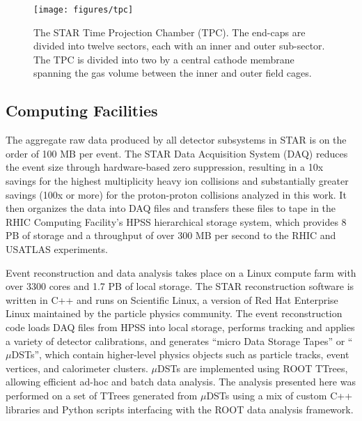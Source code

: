 \begin{figure}
  \texttt{[image: figures/tpc]}
  \caption{The STAR Time Projection Chamber (TPC). The end-caps are divided
  into twelve sectors, each with an inner and outer sub-sector. The TPC is
  divided into two by a central cathode membrane spanning the gas volume
  between the inner and outer field cages.}
  \label{fig:tpc}
\end{figure}

\subsection{Computing Facilities}

The aggregate raw data produced by all detector subsystems in STAR is on the
order of 100 MB per event. The STAR Data Acquisition System (DAQ)
\cite{Landgraf:2002zw} reduces the event size through hardware-based zero
suppression, resulting in a 10x savings for the highest multiplicity heavy ion
collisions and substantially greater savings (100x or more) for the
proton-proton collisions analyzed in this work. It then organizes the data
into DAQ files and transfers these files to tape in the RHIC Computing
Facility's HPSS hierarchical storage system, which provides 8 PB of storage
and a throughput of over 300 MB per second to the RHIC and USATLAS
experiments.

Event reconstruction and data analysis takes place on a Linux compute farm
with over 3300 cores and 1.7 PB of local storage. The STAR reconstruction
software is written in C++ and runs on Scientific Linux, a version of Red Hat
Enterprise Linux maintained by the particle physics community. The event
reconstruction code loads DAQ files from HPSS into local storage, performs
tracking and applies a variety of detector calibrations, and generates ``micro
Data Storage Tapes'' or ``$\mu$DSTs'', which contain higher-level physics
objects such as particle tracks, event vertices, and calorimeter clusters.
$\mu$DSTs are implemented using ROOT \cite{Brun:1997pa} TTrees, allowing
efficient ad-hoc and batch data analysis. The analysis presented here was
performed on a set of TTrees generated from $\mu$DSTs using a mix of custom
C++ libraries and Python scripts interfacing with the ROOT data analysis
framework.
